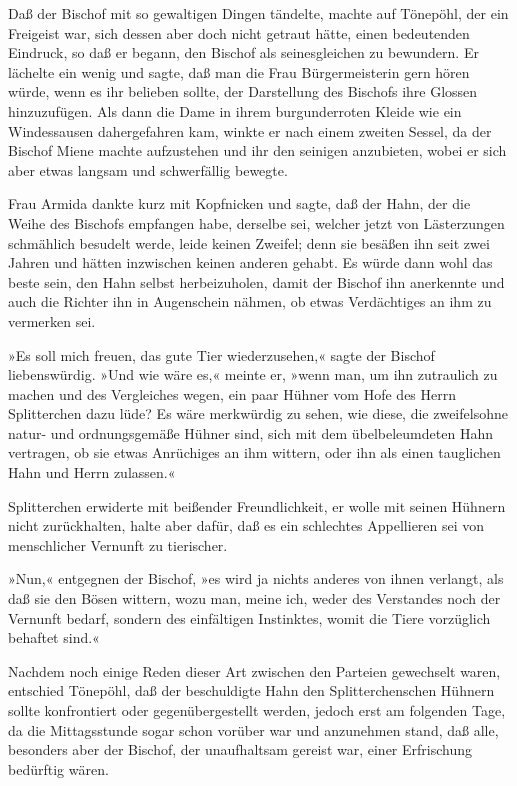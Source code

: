 Daß der Bischof mit so gewaltigen Dingen tändelte, machte auf
Tönepöhl, der ein Freigeist war, sich dessen aber doch nicht
getraut hätte, einen bedeutenden Eindruck, so daß \pagenum{[40]} er
begann, den Bischof als seinesgleichen zu bewundern. Er lächelte
ein wenig und sagte, daß man die Frau Bürgermeisterin gern hören
würde, wenn es ihr belieben sollte, der Darstellung des Bischofs
ihre Glossen hinzuzufügen. Als dann die Dame in ihrem
burgunderroten Kleide wie ein Windessausen dahergefahren kam,
winkte er nach einem zweiten Sessel, da der Bischof Miene machte
aufzustehen und ihr den seinigen anzubieten, wobei er sich aber
etwas langsam und schwerfällig bewegte.

Frau Armida dankte kurz mit Kopfnicken und sagte, daß der Hahn, der
die Weihe des Bischofs empfangen habe, derselbe sei, welcher jetzt
von Lästerzungen schmählich besudelt werde, leide keinen Zweifel;
denn sie besäßen ihn seit zwei Jahren und hätten inzwischen keinen
anderen gehabt. Es würde dann wohl das beste sein, den Hahn selbst
herbeizuholen, damit der Bischof ihn anerkennte und auch die
Richter ihn in Augenschein nähmen, ob etwas Verdächtiges an ihm zu
vermerken sei.

»Es soll mich freuen, das gute Tier wiederzusehen,« sagte der
Bischof liebenswürdig. »Und wie wäre es,« meinte er, »wenn man, um
ihn zutraulich zu machen und des Vergleiches wegen, ein paar Hühner
vom Hofe des Herrn Splitterchen dazu lüde? Es wäre merkwürdig zu
sehen, wie diese, die zweifelsohne natur- und ordnungsgemäße Hühner
sind, sich mit dem übelbeleumdeten Hahn vertragen, ob sie etwas
Anrüchiges an ihm wittern, oder ihn als einen tauglichen Hahn und
Herrn zulassen.«

Splitterchen erwiderte mit beißender Freundlichkeit, er wolle mit
seinen Hühnern nicht zurückhalten, halte aber dafür, daß es ein
schlechtes Appellieren sei von menschlicher Vernunft zu
tierischer.

\pagenum{[41]} »Nun,« entgegnen der Bischof, »es wird ja nichts
anderes von ihnen verlangt, als daß sie den Bösen wittern, wozu
man, meine ich, weder des Verstandes noch der Vernunft bedarf,
sondern des einfältigen Instinktes, womit die Tiere vorzüglich
behaftet sind.«

Nachdem noch einige Reden dieser Art zwischen den Parteien
gewechselt waren, entschied Tönepöhl, daß der beschuldigte Hahn den
Splitterchenschen Hühnern sollte konfrontiert oder
gegenübergestellt werden, jedoch erst am folgenden Tage, da die
Mittagsstunde sogar schon vorüber war und anzunehmen stand, daß
alle, besonders aber der Bischof, der unaufhaltsam gereist war,
einer Erfrischung bedürftig wären.

